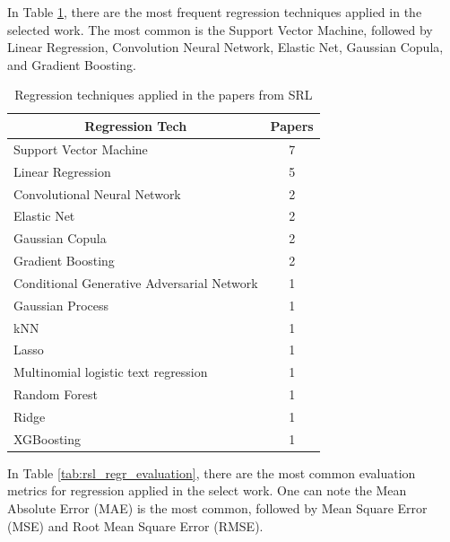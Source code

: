 In Table \ref{tab:rsl_regr_tech}, there are the most frequent regression techniques applied in the selected work. The most common is the Support Vector Machine, followed by Linear Regression, Convolution Neural Network, Elastic Net, Gaussian Copula, and Gradient Boosting.

\begin{table}[htb]
\centering
\caption{Regression techniques applied in the  papers from SRL}
\label{tab:rsl_regr_tech}
\footnotesize
\begin{tabular}{@{}lc@{}}
\toprule
\multicolumn{1}{c}{\textbf{Regression Tech}} & \textbf{Papers} \\ \midrule
Support Vector Machine & 7 \\
Linear Regression & 5 \\
Convolutional Neural Network & 2 \\
Elastic Net & 2 \\
Gaussian Copula & 2 \\
Gradient Boosting & 2 \\
Conditional Generative Adversarial Network & 1 \\
Gaussian Process & 1 \\
kNN & 1 \\
Lasso & 1 \\
Multinomial logistic text regression & 1 \\
Random Forest & 1 \\
Ridge & 1 \\
XGBoosting & 1 \\ \bottomrule
\end{tabular}
\end{table}

In Table \ref{tab:rsl_regr_evaluation}, there are the most common evaluation metrics for regression applied in the select work. One can note the Mean Absolute Error (MAE) is the most common, followed by Mean Square Error (MSE) and Root Mean Square Error (RMSE).


